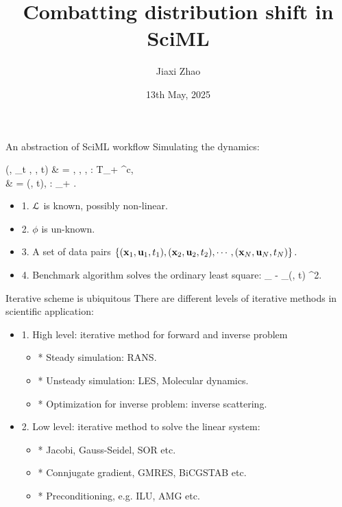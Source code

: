 \documentclass[aspectratio=169]{beamer}
\title[Distribution Mismatch]{Combatting distribution shift in SciML}
\author[J. Zhao]{Jiaxi Zhao}
\date{13th May, 2025}
\begin{document}
\par \setlength{\parindent}{2em}

\begin{frame}
\titlepage

\end{frame}

\begin{frame}{An abstraction of SciML workflow}
	Simulating the dynamics:
	\bequn
		\begin{aligned}
			\mcL(\mfx, \p_t \mfx, \mfu, t) & = , \quad \mfx \in \mcX, \mfu \in \mcU, \mcL: \mcX \times T\mcX \times \mcU \times \mbR_+ \rightarrow \mbR^{c},			\\
			\mfu & = \phi(\mfx, t), \quad \phi: \mcX \times \mbR_+ \rightarrow \mfu.
		\end{aligned}
	\eequn
	\begin{itemize}
		\item 1. $\mathcal{L}$ is known, possibly non-linear.
		\item 2. $\phi$ is un-known.
		\item 3. A set of data pairs $\left\{ (\mathbf{x}_1, \mathbf{u}_1, t_1), (\mathbf{x}_2, \mathbf{u}_2, t_2), \cdots, (\mathbf{x}_N, \mathbf{u}_N, t_N )\right\}. $
		\item 4. Benchmark algorithm solves the ordinary least square:
		\bequn
			\arg\min_{\theta} \mbE \norml \mfu - \phi_{\theta}(\mfx, t) \normr^2.
		\eequn
	\end{itemize}

\end{frame}

\begin{frame}{Iterative scheme is ubiquitous}
	There are different levels of iterative methods in scientific application:
	\begin{itemize}
		\item 1. High level: iterative method for forward and inverse problem
			\begin{itemize}
				\item * Steady simulation: RANS.
				\item * Unsteady simulation: LES, Molecular dynamics.
				\item * Optimization for inverse problem: inverse scattering.
			\end{itemize}
		\item 2. Low level: iterative method to solve the linear system:
			\begin{itemize}
				\item * Jacobi, Gauss-Seidel, SOR etc.
				\item * Connjugate gradient, GMRES, BiCGSTAB etc.
				\item * Preconditioning, e.g. ILU, AMG etc.
			\end{itemize}
	\end{itemize}
\end{frame}
\end{document}
